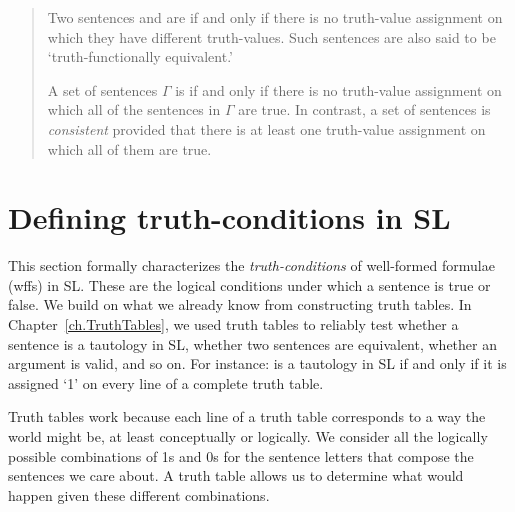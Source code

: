 {{\begin{quote}
Two sentences \metaA{} and \metaB{} are  if and only if there is no truth-value assignment on which they have different truth-values. Such sentences are also said to be `truth-functionally equivalent.'

A set of sentences $\Gamma$ is  if and only if there is no truth-value assignment on which all of the sentences in $\Gamma$ are true. In contrast, a set of sentences is \textit{consistent} provided that there is at least one truth-value assignment on which all of them are true. 
 \end{quote}


\section{Defining truth-conditions in SL}
\label{sec:truthSL}
\label{sec.semanticsSL}


{\color{black}This section formally characterizes the \emph{truth-conditions} of well-formed formulae (wffs) in SL. These are the logical conditions under which a sentence is true or false.} We build on what we already know from constructing truth tables. In Chapter~\ref{ch.TruthTables}, we used truth tables to reliably test whether a sentence is a tautology in SL, whether two sentences are equivalent, whether an argument is valid, and so on. For instance: \metaA{} is a tautology in SL if and only if it is assigned `1' on every line of a complete truth table.

Truth tables work because each line of a truth table corresponds to a way the world might be, at least conceptually or logically. We consider all the logically possible combinations of 1s and 0s for the sentence letters that compose the sentences we care about. A truth table allows us to determine what would happen given these different combinations. 

}}
